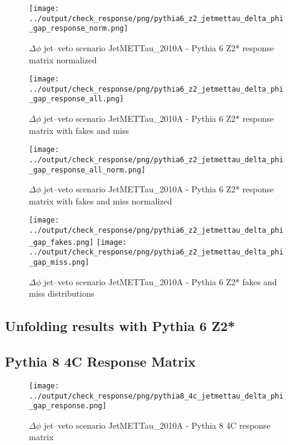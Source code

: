 \documentclass[11pt]{book}
\begin{document}
\begin{figure}[ht]
\centering
\texttt{[image: ../output/check\_response/png/pythia6\_z2\_jetmettau\_delta\_phi\_gap\_response\_norm.png]}
\caption{$\Delta\phi$ jet--veto scenario JetMETTau\_2010A - Pythia 6 Z2* response matrix normalized}
\label{p6_jetmettau_delta_phi_gap_response_norm}
\end{figure}

\begin{figure}[ht]
\centering
\texttt{[image: ../output/check\_response/png/pythia6\_z2\_jetmettau\_delta\_phi\_gap\_response\_all.png]}
\caption{$\Delta\phi$ jet--veto scenario JetMETTau\_2010A - Pythia 6 Z2* response matrix with fakes and miss}
\label{p6_jetmettau_delta_phi_gap_response_all}
\end{figure}

\begin{figure}[ht]
\centering
\texttt{[image: ../output/check\_response/png/pythia6\_z2\_jetmettau\_delta\_phi\_gap\_response\_all\_norm.png]}
\caption{$\Delta\phi$ jet--veto scenario JetMETTau\_2010A - Pythia 6 Z2* response matrix with fakes and miss normalized}
\label{p6_jetmettau_delta_phi_gap_response_all_norm}
\end{figure}

\begin{figure}[ht]
\centering
\texttt{[image: ../output/check\_response/png/pythia6\_z2\_jetmettau\_delta\_phi\_gap\_fakes.png]}
\texttt{[image: ../output/check\_response/png/pythia6\_z2\_jetmettau\_delta\_phi\_gap\_miss.png]}
\caption{$\Delta\phi$ jet--veto scenario JetMETTau\_2010A - Pythia 6 Z2* fakes and miss distributions}
\label{p6_jetmettau_delta_phi_gap_fakesmiss}
\end{figure}


\clearpage
\subsection{Unfolding results with Pythia 6 Z2*}


\clearpage
\subsection{Pythia 8 4C Response Matrix}


\begin{figure}[ht]
\centering
\texttt{[image: ../output/check\_response/png/pythia8\_4c\_jetmettau\_delta\_phi\_gap\_response.png]}
\caption{$\Delta\phi$ jet--veto scenario JetMETTau\_2010A - Pythia 8 4C response matrix}
\label{p8_jetmettau_delta_phi_gap_response}
\end{figure}
\end{document}
